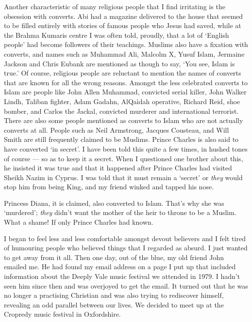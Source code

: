 \documentclass[12pt]{memoir}
\begin{document}
Another characteristic of many religious people
that I find irritating is the obsession with converts.
Abi had a magazine delivered to the house that seemed to be filled entirely
with stories of famous people who Jesus had saved,
while at the Brahma Kumaris centre I was often told, proudly,
that a lot of ‘English people’ had become followers of their teachings.
Muslims also have a fixation with converts, and names such as Muhammad Ali,
Malcolm X, Yusuf Islam, Jermaine Jackson and Chris Eubank
are mentioned as though to say, ‘You see, Islam is true.’
Of course, religious people are reluctant to mention
the names of converts that are known for all the wrong reasons.
Amongst the less celebrated converts to Islam are people
like John Allen Muhammad, convicted serial killer,
John Walker Lindh, Taliban fighter, Adam Gadahn,
Al\–Qa\`idah operative, Richard Reid, shoe bomber,
and Carlos the Jackal, convicted murderer and international terrorist.
There are also some people mentioned as converts to Islam
who are not actually converts at all.
People such as Neil Armstrong, Jacques Cousteau, and Will Smith
are still frequently claimed to be Muslims.
Prince Charles is also said to have converted ‘in secret’.
I have been told this quite a few times, in hushed tones of course —
so as to keep it a secret.
When I questioned one brother about this, he insisted it was true and that
it happened after Prince Charles had visited Sheikh Nazim in Cyprus.
I was told that it must remain a ‘secret’ or \emph{they}
would stop him from being King, and my friend winked and tapped his nose.

Princess Diana, it is claimed, also converted to Islam.
That’s why she was ‘murdered’;
\emph{they} didn’t want the mother of the heir to throne to be a Muslim.
What a shame! If only Prince Charles had known.

I began to feel less and less comfortable amongst devout believers
and I felt tired of humouring people who believed things
that I regarded as absurd.
I just wanted to get away from it all.
Then one day, out of the blue,
my old friend John  emailed me.
He had found my email address on a page I put up that included information
about the Deeply Vale music festival we attended in 1979.
I hadn’t seen him since then and was overjoyed to get the email.
It turned out that he was no longer a practising Christian
and was also trying to re\cor{\–}{}discover himself,
revealing an odd parallel between our lives.
We decided to meet up at the Cropredy music festival in Oxfordshire.
\end{document}
